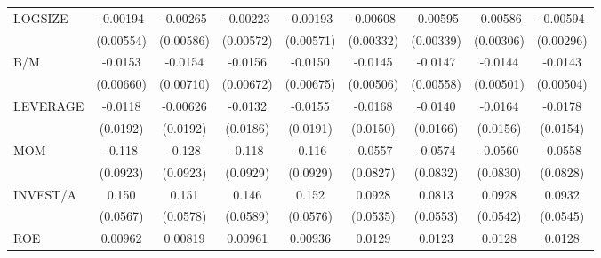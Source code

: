 \begin{table}[htbp]
\begin{tabular}{l*{8}{c}}
LOGSIZE             &    -0.00194         &    -0.00265         &    -0.00223         &    -0.00193         &    -0.00608\sym{*}  &    -0.00595\sym{*}  &    -0.00586\sym{*}  &    -0.00594\sym{**} \\
                    &   (0.00554)         &   (0.00586)         &   (0.00572)         &   (0.00571)         &   (0.00332)         &   (0.00339)         &   (0.00306)         &   (0.00296)         \\
B/M                 &     -0.0153\sym{**} &     -0.0154\sym{**} &     -0.0156\sym{**} &     -0.0150\sym{**} &     -0.0145\sym{***}&     -0.0147\sym{**} &     -0.0144\sym{***}&     -0.0143\sym{***}\\
                    &   (0.00660)         &   (0.00710)         &   (0.00672)         &   (0.00675)         &   (0.00506)         &   (0.00558)         &   (0.00501)         &   (0.00504)         \\
LEVERAGE            &     -0.0118         &    -0.00626         &     -0.0132         &     -0.0155         &     -0.0168         &     -0.0140         &     -0.0164         &     -0.0178         \\
                    &    (0.0192)         &    (0.0192)         &    (0.0186)         &    (0.0191)         &    (0.0150)         &    (0.0166)         &    (0.0156)         &    (0.0154)         \\
MOM                 &      -0.118         &      -0.128         &      -0.118         &      -0.116         &     -0.0557         &     -0.0574         &     -0.0560         &     -0.0558         \\
                    &    (0.0923)         &    (0.0923)         &    (0.0929)         &    (0.0929)         &    (0.0827)         &    (0.0832)         &    (0.0830)         &    (0.0828)         \\
INVEST/A            &       0.150\sym{***}&       0.151\sym{**} &       0.146\sym{**} &       0.152\sym{**} &      0.0928\sym{*}  &      0.0813         &      0.0928\sym{*}  &      0.0932\sym{*}  \\
                    &    (0.0567)         &    (0.0578)         &    (0.0589)         &    (0.0576)         &    (0.0535)         &    (0.0553)         &    (0.0542)         &    (0.0545)         \\
ROE                 &     0.00962         &     0.00819         &     0.00961         &     0.00936         &      0.0129         &      0.0123         &      0.0128         &      0.0128         \\

\end{tabular}
\end{table}
